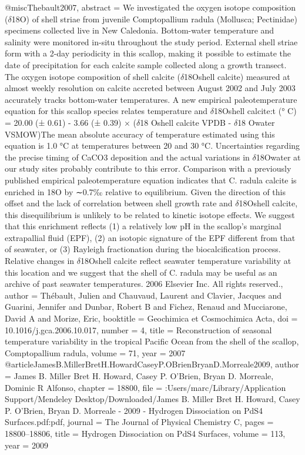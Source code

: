 @misc{Thebault2007,
abstract = {We investigated the oxygen isotope composition ($\delta$18O) of shell striae from juvenile Comptopallium radula (Mollusca; Pectinidae) specimens collected live in New Caledonia. Bottom-water temperature and salinity were monitored in-situ throughout the study period. External shell striae form with a 2-day periodicity in this scallop, making it possible to estimate the date of precipitation for each calcite sample collected along a growth transect. The oxygen isotope composition of shell calcite ($\delta$18Oshell calcite) measured at almost weekly resolution on calcite accreted between August 2002 and July 2003 accurately tracks bottom-water temperatures. A new empirical paleotemperature equation for this scallop species relates temperature and $\delta$18Oshell calcite:t (° C) = 20.00 (± 0.61) - 3.66 (± 0.39) × ($\delta$18 Oshell calcite VPDB - $\delta$18 Owater VSMOW)The mean absolute accuracy of temperature estimated using this equation is 1.0 °C at temperatures between 20 and 30 °C. Uncertainties regarding the precise timing of CaCO3 deposition and the actual variations in $\delta$18Owater at our study sites probably contribute to this error. Comparison with a previously published empirical paleotemperature equation indicates that C. radula calcite is enriched in 18O by ∼0.7‰ relative to equilibrium. Given the direction of this offset and the lack of correlation between shell growth rate and $\delta$18Oshell calcite, this disequilibrium is unlikely to be related to kinetic isotope effects. We suggest that this enrichment reflects (1) a relatively low pH in the scallop's marginal extrapallial fluid (EPF), (2) an isotopic signature of the EPF different from that of seawater, or (3) Rayleigh fractionation during the biocalcification process. Relative changes in $\delta$18Oshell calcite reflect seawater temperature variability at this location and we suggest that the shell of C. radula may be useful as an archive of past seawater temperatures. {\textcopyright} 2006 Elsevier Inc. All rights reserved.},
author = {Th{\'{e}}bault, Julien and Chauvaud, Laurent and Clavier, Jacques and Guarini, Jennifer and Dunbar, Robert B and Fichez, Renaud and Mucciarone, David A and Morize, Eric},
booktitle = {Geochimica et Cosmochimica Acta},
doi = {10.1016/j.gca.2006.10.017},
number = {4},
title = {{Reconstruction of seasonal temperature variability in the tropical Pacific Ocean from the shell of the scallop, Comptopallium radula}},
volume = {71},
year = {2007}
}
@article{JamesB.MillerBretH.HowardCaseyP.OBrienBryanD.Morreale2009,
author = {{James B. Miller Bret H. Howard, Casey P. O'Brien, Bryan D. Morreale}, Dominic R Alfonso},
chapter = {18800},
file = {:Users/marc/Library/Application Support/Mendeley Desktop/Downloaded/James B. Miller Bret H. Howard, Casey P. O'Brien, Bryan D. Morreale - 2009 - Hydrogen Dissociation on PdS4 Surfaces.pdf:pdf},
journal = {The Journal of Physical Chemistry C},
pages = {18800--18806},
title = {{Hydrogen Dissociation on PdS4 Surfaces}},
volume = {113},
year = {2009}
}
